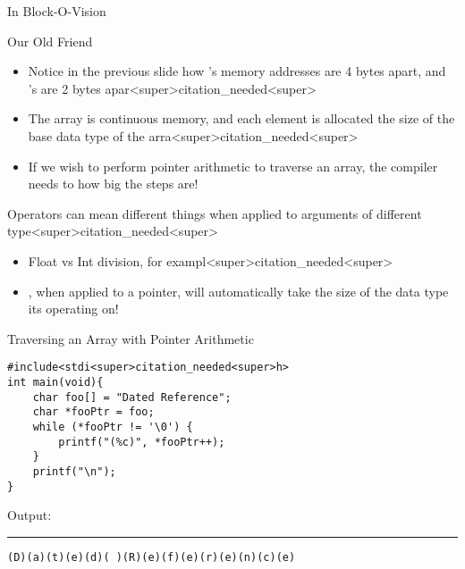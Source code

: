 \documentclass[11pt]{beamer}
\let\OldTexttt\texttt
\renewcommand{\texttt}[1]{\OldTexttt{\color{teal}{#1}}}
\begin{document}
\begin{frame}{In Block-O-Vision}
\center
\
\end{frame}

\begin{frame}{Our Old Friend \texttt{++}}
\begin{itemize}
\item Notice in the previous slide how \texttt{foo}'s memory addresses are 4 bytes apart, and \texttt{bar}'s are 2 bytes apar<super>citation_needed<super>
\item The array is continuous memory, and each element is allocated the size of the base data type of the arra<super>citation_needed<super>
\item If we wish to perform pointer arithmetic to traverse an array, the compiler needs to how big the steps are!
\end{itemize}
Operators can mean different things when applied to arguments of different type<super>citation_needed<super>
\begin{itemize}
\item Float vs Int division, for exampl<super>citation_needed<super>
\item \texttt{++}, when applied to a pointer, will automatically take the size of the data type its operating on! 
\end{itemize}
\end{frame}

\begin{frame}[fragile=singleslide]{Traversing an Array with Pointer Arithmetic}
\begin{lstlisting}[style=C]
#include<stdi<super>citation_needed<super>h>
int main(void){
	char foo[] = "Dated Reference";
	char *fooPtr = foo;
	while (*fooPtr != '\0') {
		printf("(%c)", *fooPtr++);
	} 
	printf("\n");
}
\end{lstlisting}
Output:
\hrule
\begin{verbatim}
(D)(a)(t)(e)(d)( )(R)(e)(f)(e)(r)(e)(n)(c)(e)
\end{verbatim}
\end{frame}
\end{document}
